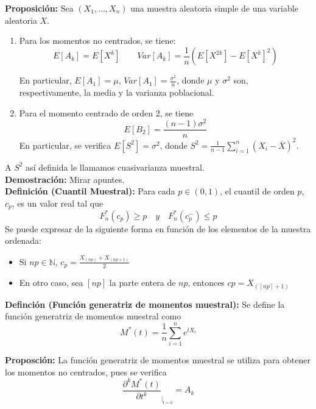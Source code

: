 \documentclass{article}
\begin{document}
\textbf{Proposición:} Sea $(X_1,\ldots,X_n)$ una muestra aleatoria simple de una variable aleatoria $X$. 
\begin{enumerate}
\item Para los momentos no centrados, se tiene:
\begin{equation*}
E[A_k]=E[X^k]\qquad Var[A_k]=\frac{1}{n}(E[X^{2k}]-E[X^k]^2)
\end{equation*}

En particular, $E[A_1]=\mu$, $Var[A_1]=\frac{\sigma^2}{n}$, donde $\mu$ y $\sigma^2$ son, respectivamente, la media y la varianza poblacional.

\item Para el momento centrado de orden 2, se tiene
\begin{equation*}
E[B_2]=\frac{(n-1)\sigma^2}{n}
\end{equation*}
En particular, se verifica $E[S^2]=\sigma^2$, donde $S^2=\frac{1}{n-1}\sum_{i=1}^n(X_i-\overline{X})^2$.
\end{enumerate}

A $S^2$ así definida le llamamos cuasivarianza muestral.\\

\textbf{Demostración:} Mirar apuntes.\\

\textbf{Definición (Cuantil Muestral):} Para cada $p\in (0,1)$, el cuantil de orden $p$, $c_p$, es un valor real tal que 
\begin{equation*}
F_n^*(c_p)\geq p\quad y\quad F_n^*(c_p^-)\leq p
\end{equation*}
Se puede expresar de la siguiente forma en función de los elementos de la muestra ordenada:
\begin{itemize}
\item Si $np\in \mathbb{N}$, $c_p=\frac{X_{(np)}+X_{(np+1)}}{2}$

\item En otro caso, sea $[np]$ la parte entera de $np$, entonces $cp = X_{([np]+1)}$
\end{itemize}

\textbf{Definción (Función generatriz de momentos muestral):} Se define la función generatriz de momentos muestral como 
\begin{equation*}
M^*(t)=\frac{1}{n}\sum_{i=1}^n e^{tX_i}
\end{equation*}

\textbf{Proposción:} La función generatriz de momentos muestral se utiliza para obtener los momentos no centrados, pues se verifica 
\begin{equation*}
\frac{\partial^k M^*(t)}{\partial t^k}_{|_{t=0}}=A_k
\end{equation*}
\end{document}
